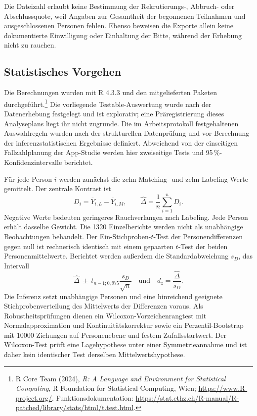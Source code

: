 Die Dateizahl erlaubt keine Bestimmung der Rekrutierungs-, Abbruch- oder Abschlussquote, weil Angaben zur Gesamtheit der begonnenen Teilnahmen und ausgeschlossenen Personen fehlen. Ebenso beweisen die Exporte allein keine dokumentierte Einwilligung oder Einhaltung der Bitte, während der Erhebung nicht zu rauchen.

\subsection{Statistisches Vorgehen}
Die Berechnungen wurden mit R 4.3.3 und den mitgelieferten Paketen durchgeführt.\footnote{R Core Team (2024), \emph{R: A Language and Environment for Statistical Computing}, R Foundation for Statistical Computing, Wien; \url{https://www.R-project.org/}. Funktionsdokumentation: \url{https://stat.ethz.ch/R-manual/R-patched/library/stats/html/t.test.html}.} Die vorliegende Testable-Auswertung wurde nach der Datenerhebung festgelegt und ist explorativ; eine Präregistrierung dieses Analyseplans liegt ihr nicht zugrunde. Die im Arbeitsprotokoll festgehaltenen Auswahlregeln wurden nach der strukturellen Datenprüfung und vor Berechnung der inferenzstatistischen Ergebnisse definiert. Abweichend von der einseitigen Fallzahlplanung der App-Studie werden hier zweiseitige Tests und 95\,\%-Konfidenzintervalle berichtet.

Für jede Person $i$ werden zunächst die zehn Matching- und zehn Labeling-Werte gemittelt. Der zentrale Kontrast ist
\begin{equation}
 D_i=\overline{Y}_{i,L}-\overline{Y}_{i,M},\qquad
 \widehat{\Delta}=\frac{1}{n}\sum_{i=1}^{n}D_i.
\end{equation}
Negative Werte bedeuten geringeres Rauchverlangen nach Labeling. Jede Person erhält dasselbe Gewicht. Die 1320 Einzelberichte werden nicht als unabhängige Beobachtungen behandelt. Der Ein-Stichproben-$t$-Test der Personendifferenzen gegen null ist rechnerisch identisch mit einem gepaarten $t$-Test der beiden Personenmittelwerte. Berichtet werden außerdem die Standardabweichung $s_D$, das Intervall
\begin{equation}
 \widehat{\Delta}\ \pm\ t_{n-1;0{,}975}\frac{s_D}{\sqrt{n}}
 \quad\text{und}\quad d_z=\frac{\widehat{\Delta}}{s_D}.
\end{equation}
Die Inferenz setzt unabhängige Personen und eine hinreichend geeignete Stichprobenverteilung des Mittelwerts der Differenzen voraus. Als Robustheitsprüfungen dienen ein Wilcoxon-Vorzeichenrangtest mit Normalapproximation und Kontinuitätskorrektur sowie ein Perzentil-Bootstrap mit 10000 Ziehungen auf Personenebene und festem Zufallsstartwert. Der Wilcoxon-Test prüft eine Lagehypothese unter einer Symmetrieannahme und ist daher kein identischer Test derselben Mittelwertshypothese.

